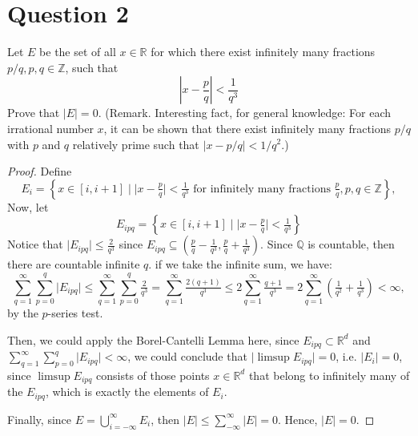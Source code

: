 \section{Question 2}

\begin{question}
    [15 points] Let $E$ be the set of all $x \in \mathbb{R}$ for which there exist infinitely many fractions $p / q, p, q \in \mathbb{Z}$, such that
    $$
    \left|x-\frac{p}{q}\right|<\frac{1}{q^3}
    $$
    Prove that $|E|=0$.
    (Remark. Interesting fact, for general knowledge: For each irrational number $x$, it can be shown that there exist infinitely many fractions $p / q$ with $p$ and $q$ relatively prime such that $|x-p / q|<1 / q^2$.)
\end{question}

\begin{answer}
    \begin{proof}
        Define 
        \begin{equation}
            E_i = \left\{x \in [i,i+1] \mid \lvert x - \tfrac{p}{q} \rvert < \tfrac{1}{q^3} \text{ for infinitely many fractions }\tfrac{p}{q}, p,q \in \mathbb{Z}\right\},
        \end{equation}
        Now, let
        \begin{equation}
            E_{ipq} = \left\{x \in [i,i+1] \mid \lvert x - \tfrac{p}{q} \rvert < \tfrac{1}{q^3}\right\}
        \end{equation}
        Notice that $\lvert E_{ipq} \rvert \leq \tfrac{2}{q^3}$ since $E_{ipq} \subseteq (\tfrac{p}{q} - \tfrac{1}{q^3}, \tfrac{p}{q} + \tfrac{1}{q^3})$. Since $\mathbb{Q}$ is countable, then there are countable infinite $q$. if we take the infinite sum, we have:
        \begin{equation}
                \sum_{q=1}^{\infty}\sum_{p=0}^{q} \lvert E_{ipq}\rvert \leq \sum_{q=1}^{\infty}\sum_{p=0}^{q}\tfrac{2}{q^3} = \sum_{q = 1}^{\infty} \tfrac{2(q+1)}{q^3} \leq 2\sum_{q=1}^{\infty}\tfrac{q+1}{q^3} = 2 \sum_{q=1}^{\infty} \left(\tfrac{1}{q^2} + \tfrac{1}{q^3}\right) < \infty,
        \end{equation}
        by the $p$-series test.
        
        Then, we could apply the Borel-Cantelli Lemma here, since $E_{ipq} \subset \mathbb{R}^d$ and $\sum_{q=1}^{\infty}\sum_{p=0}^{q} \lvert E_{ipq}\rvert < \infty$, we could conclude that $\lvert \limsup E_{ipq} \rvert = 0$, i.e. $\lvert E_i \rvert = 0$, since $\limsup E_{ipq}$ consists of those points $x \in \mathbb{R}^d$ that belong to infinitely many of the $E_{ipq}$, which is exactly the elements of $E_i$.
        
        Finally, since $E = \bigcup_{i = -\infty}^{\infty} E_i$, then $\lvert E \rvert \leq \sum_{-\infty}^{\infty} \lvert E \rvert = 0$. Hence, $\lvert E \rvert = 0$.
    \end{proof}
\end{answer}